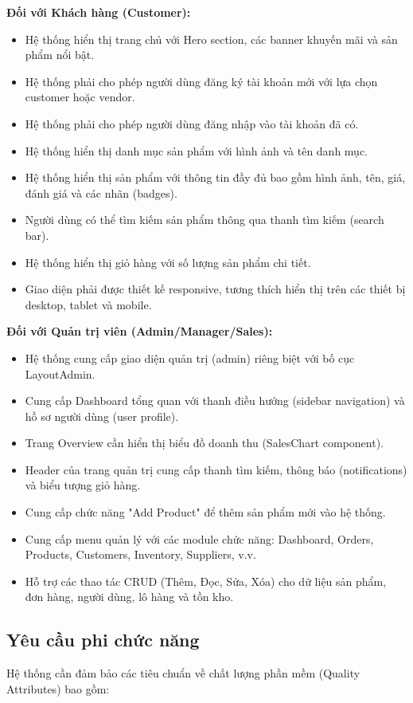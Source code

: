 \documentclass[12pt,a4paper]{report}
\begin{document}
\textbf{Đối với Khách hàng (Customer):}
\begin{itemize}
    \item Hệ thống hiển thị trang chủ với Hero section, các banner khuyến mãi và sản phẩm nổi bật.
    \item Hệ thống phải cho phép người dùng đăng ký tài khoản mới với lựa chọn customer hoặc vendor.
    \item Hệ thống phải cho phép người dùng đăng nhập vào tài khoản đã có.
    \item Hệ thống hiển thị danh mục sản phẩm với hình ảnh và tên danh mục.
    \item Hệ thống hiển thị sản phẩm với thông tin đầy đủ bao gồm hình ảnh, tên, giá, đánh giá và các nhãn (badges).
    \item Người dùng có thể tìm kiếm sản phẩm thông qua thanh tìm kiếm (search bar).
    \item Hệ thống hiển thị giỏ hàng với số lượng sản phẩm chi tiết.
    \item Giao diện phải được thiết kế responsive, tương thích hiển thị trên các thiết bị desktop, tablet và mobile.
\end{itemize}

\textbf{Đối với Quản trị viên (Admin/Manager/Sales):}
\begin{itemize}
    \item Hệ thống cung cấp giao diện quản trị (admin) riêng biệt với bố cục LayoutAdmin.
    \item Cung cấp Dashboard tổng quan với thanh điều hướng (sidebar navigation) và hồ sơ người dùng (user profile).
    \item Trang Overview cần hiển thị biểu đồ doanh thu (SalesChart component).
    \item Header của trang quản trị cung cấp thanh tìm kiếm, thông báo (notifications) và biểu tượng giỏ hàng.
    \item Cung cấp chức năng "Add Product" để thêm sản phẩm mới vào hệ thống.
    \item Cung cấp menu quản lý với các module chức năng: Dashboard, Orders, Products, Customers, Inventory, Suppliers, v.v.
    \item Hỗ trợ các thao tác CRUD (Thêm, Đọc, Sửa, Xóa) cho dữ liệu sản phẩm, đơn hàng, người dùng, lô hàng và tồn kho.
\end{itemize}

\subsection{Yêu cầu phi chức năng}
Hệ thống cần đảm bảo các tiêu chuẩn về chất lượng phần mềm (Quality Attributes) bao gồm:
\end{document}
